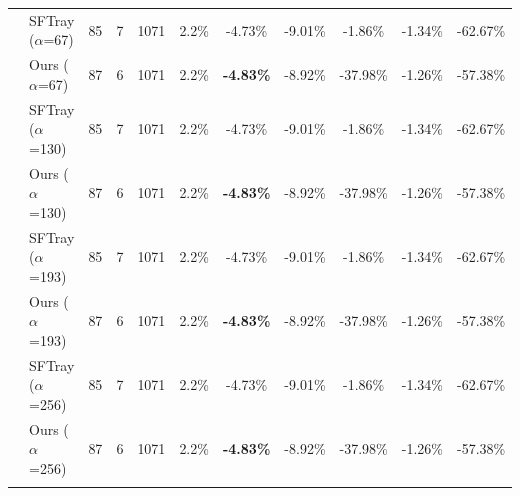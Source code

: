 \begin{table}[t]
{\begin{tabular}{ll|cccc|ccc|cc}
 & SFTray ($\alpha$=67) & 85 & 7 & 1071 & 2.2\% & -4.73\% & -9.01\% & -1.86\% & -1.34\% & -62.67\% \\

 & Ours ($\alpha$=67) & 87 & 6 & 1071 & 2.2\% & \textbf{-4.83\%} & -8.92\% & -37.98\% & -1.26\% & -57.38\% \\

\addlinespace[0.3em]

 & SFTray ($\alpha$=130) & 85 & 7 & 1071 & 2.2\% & -4.73\% & -9.01\% & -1.86\% & -1.34\% & -62.67\% \\

 & Ours ($\alpha$=130) & 87 & 6 & 1071 & 2.2\% & \textbf{-4.83\%} & -8.92\% & -37.98\% & -1.26\% & -57.38\% \\

\addlinespace[0.3em]

 & SFTray ($\alpha$=193) & 85 & 7 & 1071 & 2.2\% & -4.73\% & -9.01\% & -1.86\% & -1.34\% & -62.67\% \\

 & Ours ($\alpha$=193) & 87 & 6 & 1071 & 2.2\% & \textbf{-4.83\%} & -8.92\% & -37.98\% & -1.26\% & -57.38\% \\

\addlinespace[0.3em]

 & SFTray ($\alpha$=256) & 85 & 7 & 1071 & 2.2\% & -4.73\% & -9.01\% & -1.86\% & -1.34\% & -62.67\% \\

 & Ours ($\alpha$=256) & 87 & 6 & 1071 & 2.2\% & \textbf{-4.83\%} & -8.92\% & -37.98\% & -1.26\% & -57.38\% \\

\addlinespace[0.3em]

\midrule

\bottomrule

\end{tabular}

}

\end{table}